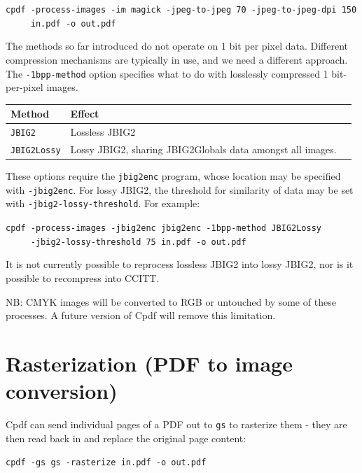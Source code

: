 \documentclass{book}
\begin{document}
  \begin{framed}
  \noindent\small\verb!cpdf -process-images -im magick -jpeg-to-jpeg 70 -jpeg-to-jpeg-dpi 150!\\
  \noindent\small\verb!     in.pdf -o out.pdf!
  \end{framed}

\noindent The methods so far introduced do not operate on 1 bit per pixel data. Different compression mechanisms are typically in use, and we need a different approach. The \texttt{-1bpp-method} option specifies what to do with losslessly compressed 1 bit-per-pixel images.

\bigskip
\begin{tabular}{lp{10cm}l}
Method & Effect\\\hline
{\small\texttt{JBIG2}} & Lossless JBIG2 \\
{\small\texttt{JBIG2Lossy}} & Lossy JBIG2, sharing JBIG2Globals data amongst all images.
\end{tabular}
\bigskip

\noindent These options require the \texttt{jbig2enc} program, whose location may be specified with \texttt{-jbig2enc}. For lossy JBIG2, the threshold for similarity of data may be set with \texttt{-jbig2-lossy-threshold}. For example:

  \begin{framed}
  \noindent\small\verb!cpdf -process-images -jbig2enc jbig2enc -1bpp-method JBIG2Lossy!\\
  \noindent\small\verb!     -jbig2-lossy-threshold 75 in.pdf -o out.pdf!
  \end{framed}

\noindent It is not currently possible to reprocess lossless JBIG2 into lossy JBIG2, nor is it possible to recompress into CCITT.

NB: CMYK images will be converted to RGB or untouched by some of these processes. A future version of Cpdf will remove this limitation.

\section{Rasterization (PDF to image conversion)}

Cpdf can send individual pages of a PDF out to \texttt{gs} to rasterize them - they are then read back in and replace the original page content:

  \begin{framed}
  \noindent\small\verb!cpdf -gs gs -rasterize in.pdf -o out.pdf!
  \end{framed}
\end{document}
